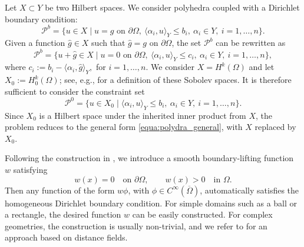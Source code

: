 \documentclass{article}
\numberwithin{equation}{section}
\begin{document}
Let $X\subset Y$ be two Hilbert spaces. We consider polyhedra coupled with a Dirichlet boundary condition:
\begin{equation}\label{equa:bound_cons}
    \mathcal{P}^b
    =
    \{u\in X\mid u=g \text{ on }\partial\Omega,\ \langle \alpha_i,u\rangle_Y\le b_i,\ \alpha_i\in Y,\ i=1,\dots,n\}.
\end{equation}
Given a function $\hat{g}\in X$ such that $\hat{g}=g$ on $\partial\Omega$, the set $\mathcal{P}^b$ can be rewritten as
\begin{equation}
    \mathcal{P}^b
    =
    \{u+\hat{g}\in X\mid u=0 \text{ on }\partial\Omega,\ \langle \alpha_i,u\rangle_Y\le c_i,\ \alpha_i\in Y,\ i=1,\dots,n\},
\end{equation}
where $c_i:=b_i-\langle \alpha_i,\hat{g}\rangle_Y,$ for $ i=1,\dots,n$.
We consider $X=H^k(\Omega)$ and let $X_0:=H_0^k(\Omega)$; see, e.g., \cite{FournierAdams} for a definition of these Sobolev spaces. It is therefore sufficient to consider the constraint set
\begin{equation}\label{equa:poly_boundary}
    \mathcal{P}^0
    =
    \{u\in X_0\mid \langle \alpha_i,u\rangle_Y\le b_i,\ \alpha_i\in Y,\ i=1,\dots,n\}.
\end{equation}
Since $X_0$ is a Hilbert space under the inherited inner product from $X$, the problem reduces to the general form \eqref{equa:polydra_general}, with $X$ replaced by $X_0$.

Following the construction in \cite{lu2021physics}, we introduce a smooth boundary-lifting function $w$ satisfying
\begin{equation}\label{equa:boundry}
    w(x)=0 \quad \text{on } \partial\Omega,
    \qquad
    w(x)>0 \quad \text{in } \Omega.
\end{equation}
Then any function of the form $w\phi$, with $\phi\in C^\infty(\overline{\Omega})$, automatically satisfies the homogeneous Dirichlet boundary condition. For simple domains such as a ball or a rectangle, the desired function $w$ can be easily constructed. For complex geometries, the construction is usually non-trivial, and we refer to \cite{sukumar2022exact} for an approach based on distance fields.
\end{document}
